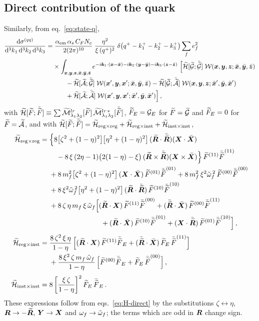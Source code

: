 \subsection{Direct contribution of the quark}
\label{sec:xs-q}

Similarly, from eq.~\eqref{eq:state-q},
\begin{align}
\frac{\dd\sigma^{(qq)}}{\dd^3k_1\,\dd^3k_2\,\dd^3k_3}=&\;
\frac{\aem\,\as\,\CF\Nc}{2(2\pi)^{10}}\;\frac{\eta^2}{\xi\,(q^+)^2}\;
\delta\big(q^+-k_1^+-k_2^+-k_3^+\big)\sum_fe_f^2
\nonumber\\
&\times\int_{\x,\y,\z,\bx,\by,\bz}e^{-i\kk_1\cdot(\x-\bx)-i\kk_2\cdot(\y-\by)-i\kk_3\cdot(\z-\bz)}\;
\Big[\tH[\tG;\bar\tG]\;\cW(\x,\y,\z;\bx,\by,\bz)
\nonumber\\
&\qquad-\tH[\tA;\bar\tG]\;\cW(\xp,\y,\xp;\bx,\by,\bz)
-\tH[\tG;\bar\tA]\;\cW(\x,\y,\z;\bxp,\by,\bxp)
\nonumber\\
&\qquad+\tH[\tA;\bar\tA]\;\cW(\xp,\y,\xp;\bxp,\by,\bxp)\Big]\,,
\label{eq:xs-q}
\end{align}
with $\tH[\tF;\bar\tF]\equiv\sum\tM^{lr}_{\lambda_1\lambda_2}[\tF]\,\tM^{lr\,*}_{\lambda_1\lambda_2}[\bar\tF]$,
$\tF_E=\cG_E$ for $\tF=\tG$ and $\tF_E=0$ for $\tF=\tA$, and with
$\tH[\tF;\bar\tF]=\tH_{\rm reg\times reg}+\tH_{\rm reg\times inst}+\tH_{\rm inst\times inst}$,
\begin{subequations}
\label{eq:Ht-direct}
\begin{align}
\tH_{\rm reg\times reg}={}&\Big\{8\big[\zeta^2+(1-\eta)^2\big]\big[\eta^2+(1-\eta)^2\big]\,
(\Rt\cdot\bRt)(\X\cdot\bX)
\nonumber\\
&\quad-8\,\xi\,(2\eta-1)\big(2(1-\eta)-\xi\big)\,(\Rt\times\bRt)(\X\times\bX)\Big\}\,\tF^{(11)}\bar\tF^{(11)}
\nonumber\\
&+8\,\mf^2\big[\zeta^2+(1-\eta)^2\big]\,(\X\cdot\bX)\,\tF^{(01)}\bar\tF^{(01)}
+8\,\mf^2\,\xi^2\oft^{\,2}\,\tF^{(00)}\bar\tF^{(00)}
\nonumber\\
&+8\,\xi^2\oft^{\,2}\big[\eta^2+(1-\eta)^2\big]\,(\Rt\cdot\bRt)\,\tF^{(10)}\bar\tF^{(10)}
\nonumber\\
&+8\,\zeta\,\eta\,\mf\,\xi\,\oft\Big[(\Rt\cdot\X)\,\tF^{(11)}\bar\tF^{(00)}+(\bRt\cdot\bX)\,\tF^{(00)}\bar\tF^{(11)}
\nonumber\\
&\hspace{2.6cm}+(\Rt\cdot\bX)\,\tF^{(10)}\bar\tF^{(01)}+(\X\cdot\bRt)\,\tF^{(01)}\bar\tF^{(10)}\Big]\,,
\label{eq:Htrr}\\[1mm]
\tH_{\rm reg\times inst}={}&\frac{8\,\zeta^2\,\xi\,\eta}{1-\eta}\,
\Big[(\Rt\cdot\X)\,\tF^{(11)}\bar\tF_E+(\bRt\cdot\bX)\,\tF_E\,\bar\tF^{(11)}\Big]
\nonumber\\
&+\frac{8\,\xi^2\,\zeta\,\mf\,\oft}{1-\eta}\,\Big[\tF^{(00)}\bar\tF_E+\tF_E\,\bar\tF^{(00)}\Big]\,,
\label{eq:Htri}\\[1mm]
\tH_{\rm inst\times inst}={}&8\left[\frac{\xi\,\zeta}{1-\eta}\right]^2\tF_E\,\bar\tF_E\,.
\label{eq:Htii}
\end{align}
\end{subequations}
These expressions follow from eqs.~\eqref{eq:H-direct} by the substitutions
$\zeta\leftrightarrow\eta$, $\R\to-\Rt$, $\Y\to\X$ and $\of\to\oft$; the terms which are odd in $\R$
change sign.

